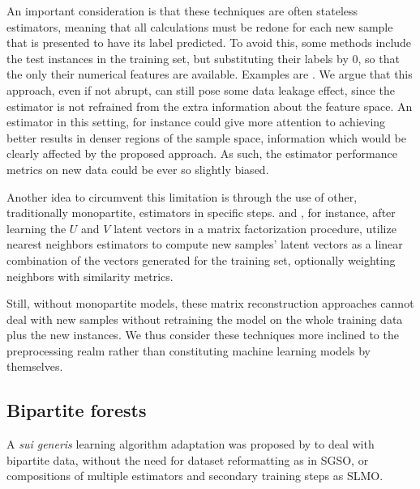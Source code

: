 An important consideration is that these techniques are often stateless
estimators, meaning that all calculations must be redone for each new sample
that is presented to have its label predicted. To avoid this, some methods
include the test instances in the training set, but substituting their labels by
0, so that the only their numerical features are available. Examples are
\cite{}. We argue that this approach, even if not abrupt, can still pose some
data leakage effect, since the estimator is not refrained from the extra
information about the feature space. An estimator in this setting, for instance
could give more attention to achieving better results in denser regions of the
sample space, information which would be clearly affected by the proposed
approach. As such, the estimator performance metrics on new data could be ever
so slightly biased.

Another idea to circumvent this limitation is through the use of other,
traditionally monopartite, estimators in specific steps. \cite{} and \cite{},
for instance, after learning the $U$ and $V$ latent vectors in a matrix
factorization procedure, utilize nearest neighbors estimators to compute new
samples' latent vectors as a linear combination of the vectors generated for the
training set, optionally weighting neighbors with similarity metrics.

Still, without monopartite models, these matrix reconstruction approaches cannot
deal with new samples without retraining the model on the whole training data
plus the new instances. We thus consider these techniques more inclined to the
preprocessing realm rather than constituting machine learning models by
themselves.



\subsection{Bipartite forests}
\label{sec:bipartite_forests}

A \textit{sui generis} learning algorithm adaptation was proposed by \textcite{pliakos2018} to deal with bipartite data, without the need for dataset reformatting as in SGSO, or compositions of multiple estimators and secondary training steps as SLMO.

